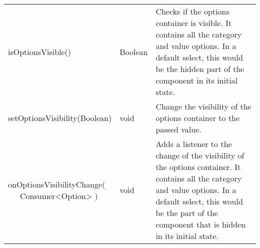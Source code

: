 \begin{table}[!htb]
\begin{tabular}{ p{5cm} p{3cm} p{4.5cm} }
        isOptionsVisible()                   & Boolean                & Checks if the options container is visible. 
                                                                        It contains all the category and value options.
        In a default select, this would be the hidden part of the component in its initial state. \\
        setOptionsVisibility(Boolean)        & void                   & Change the visibility of the options container to the passed value. \\
        \tbbr{
            onOptionsVisibilityChange( \\
                \ \ \ Consumer<Option>
            )}                               & void                   & Adds a listener to the change of the visibility of the options container. 
                                                                        It contains all the category and value options.
        In a default select, this would be the part of the component that is hidden in its initial state. \\
        \bottomrule[0.5pt]
    \end{tabular}
\end{table}

